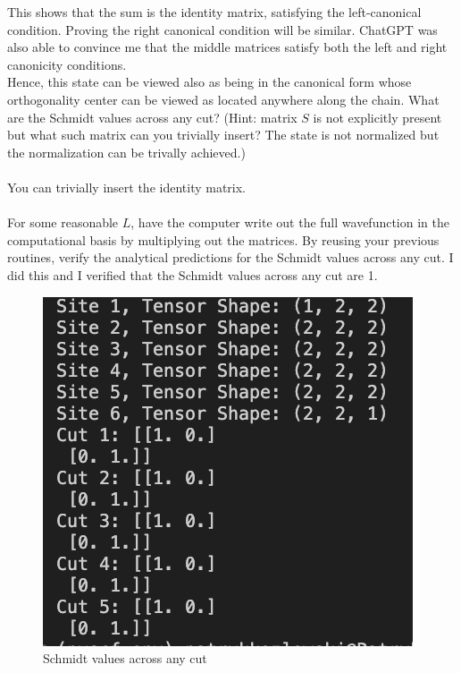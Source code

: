 \documentclass[12pt]{article}
\begin{document}
This shows that the sum is the identity matrix, satisfying the left-canonical condition. Proving the right canonical condition will be similar. ChatGPT was also able to convince me that the middle matrices satisfy both the left and right canonicity conditions.\\
Hence, this state can be viewed also as being in the canonical form whose orthogonality center can be viewed as located anywhere along the chain. What are the Schmidt values across any cut? (Hint: matrix $S$ is not explicitly present but what such matrix can you trivially insert? The state is not normalized but the normalization can be trivally achieved.) \\\\
You can trivially insert the identity matrix.\\\\
For some reasonable $L$, have the computer write out the full wavefunction in the computational basis by multiplying out the matrices. By reusing your previous routines, verify the analytical predictions for the Schmidt values across any cut.
\newpage
I did this and I verified that the Schmidt values across any cut are 1.
\begin{figure}[h]
\centering
\includegraphics[width=\textwidth]{schmidt1.png}
\caption{Schmidt values across any cut}
\end{figure}
\end{document}
